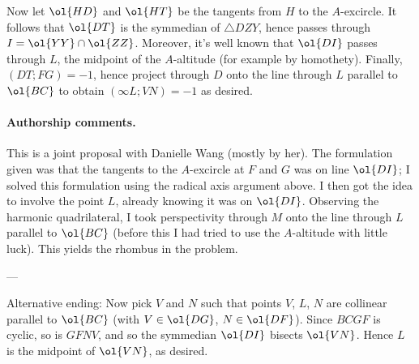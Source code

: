 Now let $\ol{HD}$ and $\ol{HT}$ be the tangents
from $H$ to the $A$-excircle.
It follows that $\ol{DT}$ is the symmedian of $\triangle DZY$,
hence passes through $I = \ol{YY} \cap \ol{ZZ}$.
Moreover, it's well known that $\ol{DI}$ passes through $L$,
the midpoint of the $A$-altitude
(for example by homothety).
Finally, $(DT;FG) = -1$,
hence project through $D$ onto the line through $L$
parallel to $\ol{BC}$ to obtain $(\infty L; VN) = -1$ as desired.

\paragraph{Authorship comments.}
This is a joint proposal with Danielle Wang (mostly by her).
The formulation given was that the tangents to the $A$-excircle
at $F$ and $G$ was on line $\ol{DI}$;
I solved this formulation using the radical axis argument above.
I then got the idea to involve the point $L$,
already knowing it was on $\ol{DI}$.
Observing the harmonic quadrilateral,
I took perspectivity through $M$ onto the line through $L$ parallel to $\ol{BC}$
(before this I had tried to use the $A$-altitude with little luck).
This yields the rhombus in the problem.

---

Alternative ending:
Now pick $V$ and $N$ such that points $V$, $L$, $N$ are collinear
parallel to $\ol{BC}$ (with $V \in \ol{DG}$, $N \in \ol{DF}$).
Since $BCGF$ is cyclic, so is $GFNV$,
and so the symmedian $\ol{DI}$ bisects $\ol{VN}$.
Hence $L$ is the midpoint of $\ol{VN}$, as desired.

